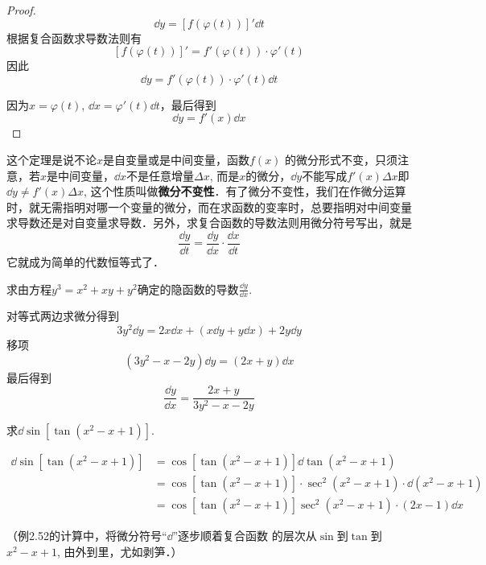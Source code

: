 \begin{proof}
   \[ \dd y=[f(\varphi (t))]'\dd t\]
根据复合函数求导数法则有
\[[f (\varphi  (t) ) ] '=f' (\varphi  (t) ) \cdot \varphi ' (t)\]
因此
\[\dd y=f' (\varphi  (t) ) \cdot \varphi' (t) \dd t\]

因为$x=\varphi  (t)$, $\dd x=\varphi ' (t) \dd t$，最后得到
\[\dd y=f' (x) \dd x\]
\end{proof}

这个定理是说不论$x$是自变量或是中间变量，函数$f(x)$
的微分形式不变，只须注意，若$x$是中间变量，$\dd x$不是任意增量$\Delta x$, 而是$x$的微分，$\dd y$不能写成$f'(x)\Delta x$即$\dd y\ne f'(x)\Delta x$, 这个性质叫做\textbf{微分不变性}．有了微分不变性，我们在作微分运算时，就无需指明对哪一个变量的微分，而在求函数的变率时，总要指明对中间变量求导数还是对自变量求导数．另外，求复合函数的导数法则用微分符号写出，就是
\[\frac{\dd y}{\dd t}=\frac{\dd y}{\dd x}\cdot \frac{\dd x}{\dd t}\]
它就成为简单的代数恒等式了．

\begin{example}
    求由方程$y^3=x^2+xy+y^2$确定的隐函数的导数$\frac{\dd y}{\dd x}$.
\end{example}

\begin{solution}
    对等式两边求微分得到
\[3y^2\dd y=2x\dd x+ (x\dd y+y\dd x) +2y\dd y\]
移项
\[(3y^2-x-2y)\dd y=(2x+y)\dd x\]
最后得到
\[\frac{\dd y}{\dd x}=\frac{2x+y}{3y^2-x-2y}\]
\end{solution}

\begin{example}
    求$\dd\sin [\tan(x^2-x+1)]$.
\end{example}


\begin{solution}
\begin{align*}
    \dd\sin \left[\tan(x^2-x+1)\right]&=\cos\left[\tan(x^2-x+1)\right]\dd \tan(x^2-x+1)\\
    &=\cos\left[\tan(x^2-x+1)\right]\cdot \sec^2 (x^2-x+1)\cdot \dd (x^2-x+1)\\
    &=\cos\left[\tan(x^2-x+1)\right]\sec^2(x^2-x+1)\cdot (2x-1)\dd x 
\end{align*}
\end{solution}
（例2.52的计算中，将微分符号“$\dd$”逐步顺着复合函数
的层次从$\sin$到$\tan$到$x^2-x+1$, 由外到里，尤如剥笋．）



